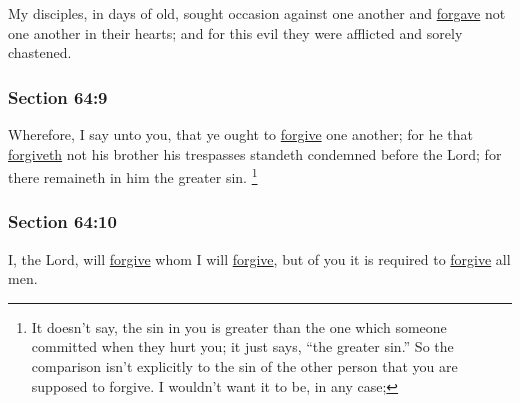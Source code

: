 		My disciples, in days of old, sought occasion against one another and \hyperref[FORGIVENESS]{forgave} not one another in their hearts; and for this evil they were afflicted and sorely chastened.


	\subsubsection{Section 64:9} %
		\label{DC64-9}

		Wherefore, I say unto you, that ye ought to \hyperref[FORGIVENESS]{forgive} one another; for he that \hyperref[FORGIVENESS]{forgiveth} not his brother his trespasses standeth condemned before the Lord; for there remaineth in him the greater sin.%
			\footnote{%
				It doesn't say, the sin in you is greater than the one which someone committed when they hurt you; it just says, ``the greater sin.'' So the comparison isn't explicitly to the sin of the other person that you are supposed to forgive. I wouldn't want it to be, in any case; 
				}


	\subsubsection{Section 64:10} %
		\label{DC64-10}

		I, the Lord, will \hyperref[FORGIVENESS]{forgive} whom I will \hyperref[FORGIVENESS]{forgive}, but of you it is required to \hyperref[FORGIVENESS]{forgive} all men.


